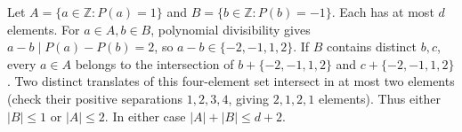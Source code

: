 Let $A=\{a\in\mathbb Z:P(a)=1\}$ and $B=\{b\in\mathbb Z:P(b)=-1\}$. Each has at most $d$ elements. For $a\in A,b\in B$, polynomial divisibility gives $a-b\mid P(a)-P(b)=2$, so $a-b\in\{-2,-1,1,2\}$. If $B$ contains distinct $b,c$, every $a\in A$ belongs to the intersection of $b+\{-2,-1,1,2\}$ and $c+\{-2,-1,1,2\}$. Two distinct translates of this four-element set intersect in at most two elements (check their positive separations $1,2,3,4$, giving $2,1,2,1$ elements). Thus either $|B|\le1$ or $|A|\le2$. In either case $|A|+|B|\le d+2$.
